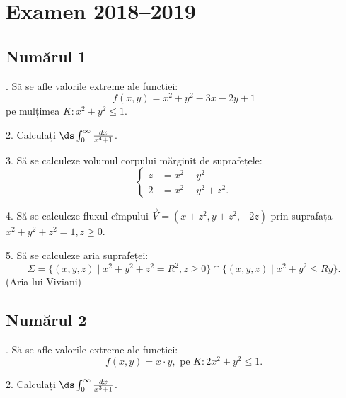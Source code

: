 
\chapter{Examen 2018--2019}

\section{Numărul 1}

\indent{}. Să se afle valorile extreme ale funcției:
\[
  f(x,y) = x^2 + y^2 - 3x - 2y + 1
\]
pe mulțimea $K: x^2 + y^2 \leq 1$.

\vspace{0.5cm}

2. Calculați $\ds\int_0^\infty \frac{dx}{x^4 + 1}$.

\vspace{0.5cm}

3. Să se calculeze volumul corpului mărginit de suprafețele:
\[
  \begin{cases}
    z &= x^2 + y^2 \\
    2 &= x^2 + y^2 + z^2.
  \end{cases}
\]

\vspace{0.5cm}

4. Să se calculeze fluxul cîmpului $\vec{V} = (x + z^2, y + z^2, -2z)$
prin suprafața $x^2 + y^2 + z^2 = 1, z \geq 0$.

\vspace{0.5cm}

5. Să se calculeze aria suprafeței:
\[
  \Sigma = \{ (x, y, z) \mid x^2 + y^2 + z^2 = R^2, z \geq 0 \} \cap %
  \{ (x, y, z) \mid x^2 + y^2 \leq Ry \}.
\]
(Aria lui Viviani)


\section{Numărul 2}

\indent{}. Să se afle valorile extreme ale funcției:
\[
  f(x, y) = x \cdot y, \text{ pe } K: 2x^2 + y^2 \leq 1.
\]

\vspace{0.5cm}

2. Calculați $\ds\int_0^\infty \frac{dx}{x^3 + 1}$.

\vspace{0.5cm}

